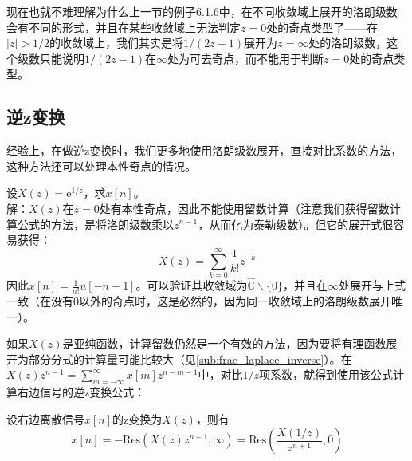 \documentclass{ctexbook}
\begin{document}
现在也就不难理解为什么上一节的例子6.1.6中，在不同收敛域上展开的洛朗级数会有不同的形式，并且在某些收敛域上无法判定$z=0$处的奇点类型了——在$|z|>1/2$的收敛域上，我们其实是将$1/(2z-1)$展开为$z=\infty$处的洛朗级数，这个级数只能说明$1/(2z-1)$在$\infty$处为可去奇点，而不能用于判断$z=0$处的奇点类型。

\subsection{逆z变换}\label{sub:z_inverse}
经验上，在做逆z变换时，我们更多地使用洛朗级数展开，直接对比系数的方法，这种方法还可以处理本性奇点的情况。
\begin{example}
    设$X(z)=\mathrm{e}^{1/z}$，求$x[n]$。\\
    解：$X(z)$在$z=0$处有本性奇点，因此不能使用留数计算（注意我们获得留数计算公式的方法，是将洛朗级数乘以$z^{n-1}$，从而化为泰勒级数）。但它的展开式很容易获得：
    \[X(z)=\sum_{k=0}^{\infty}\frac{1}{k!}z^{-k}\]
    因此$x[n]=\frac{1}{n!}u[-n-1]$。可以验证其收敛域为$\hat{\mathbb{C}}\backslash\{0\}$，并且在$\infty$处展开与上式一致（在没有$0$以外的奇点时，这是必然的，因为同一收敛域上的洛朗级数展开唯一）。
\end{example}

如果$X(z)$是亚纯函数，计算留数仍然是一个有效的方法，因为要将有理函数展开为部分分式的计算量可能比较大（见\ref{sub:frac_laplace_inverse}）。在$X(z)z^{n-1}=\sum_{m=-\infty}^{\infty}x[m]z^{n-m-1}$中，对比$1/z$项系数，就得到使用该公式计算右边信号的逆z变换公式：
\begin{claim}
    设右边离散信号$x[n]$的z变换为$X(z)$，则有
    \[x[n]=-\text{Res}\left(X(z)z^{n-1},\infty\right)=\text{Res}\left(\frac{X(1/z)}{z^{n+1}},0\right)\]
\end{claim}
\end{document}

